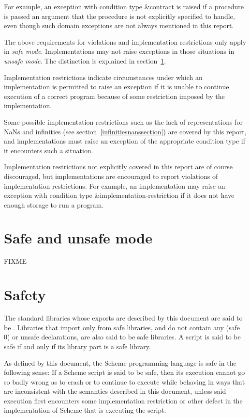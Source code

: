 \vest For example, an exception with condition type {\cf\&contract}
is raised if a procedure is passed an argument that the procedure
is not explicitly specified to handle, even though such domain
exceptions are not always mentioned in this report.

The above requirements for violations and implementation restrictions
only apply in \textit{safe mode}.  Implementations may not raise
exceptions in those situations in \textit{unsafe mode}.  The
distinction is explained in section~\ref{safeunsafemodesection}.

Implementation restrictions indicate circumstances under which an
implementation is permitted to raise an exception if it is unable to
continue execution of a correct program because of some restriction
imposed by the implementation.

Some possible implementation restrictions
such as the lack of representations for NaNs and infinities (see
section~\ref{infinitiesnanssection}) are covered by this report, and
implementations must raise an exception of the appropriate condition
type if it encounters such a situation.

Implementation restrictions not explicitly covered in this report are
of course discouraged, but implementations are encouraged to report
violations of implementation restrictions. For example, an implementation may raise an exception
with condition type {\cf\&implementation-restriction} if it does not
have enough storage to run a program.


\section{Safe and unsafe mode}
\label{safeunsafemodesection}

FIXME

\section{Safety}

The standard libraries whose exports are described by this
document are said to be .  Libraries
that import only from safe libraries, and do not contain any
{\cf (safe 0)} or {\cf unsafe} declarations, are also said
to be safe libraries.  A script is said to be safe if and
only if its library part is a safe library.

As defined by this document, the Scheme programming language
is safe in the following sense:
If a Scheme script is said to be safe, then its execution
cannot go so badly wrong as to crash or to continue to
execute while behaving in ways that are
inconsistent with the semantics described in this document,
unless said execution first encounters some implementation
restriction or other defect in the implementation of Scheme
that is executing the script.

